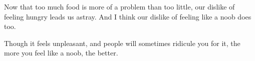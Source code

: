 Now that too much food
                  is more of a problem than too little, our dislike of feeling
                  hungry leads us astray. And I think our dislike of feeling
                  like a noob does too.

Though it feels unpleasant,
                  and people will sometimes ridicule you for it, the more you
                  feel like a noob, the better.






              
            
          
